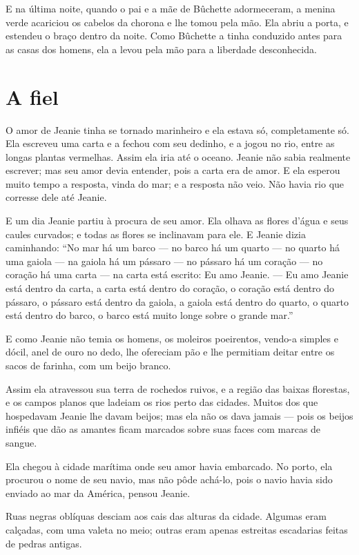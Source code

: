 E na última noite, quando o pai e a mãe de Bûchette adormeceram, a
menina verde acariciou os cabelos da chorona e lhe tomou pela mão. Ela
abriu a porta, e estendeu o braço dentro da noite. Como Bûchette a tinha
conduzido antes para as casas dos homens, ela a levou pela mão para a
liberdade desconhecida.

\section{A fiel}

O amor de Jeanie tinha se tornado marinheiro e ela estava só,
completamente só. Ela escreveu uma carta e a fechou com seu dedinho, e a
jogou no rio, entre as longas plantas vermelhas. Assim ela iria até o
oceano. Jeanie não sabia realmente escrever; mas seu amor devia entender,
pois a carta era de amor. E ela esperou muito tempo a resposta, vinda do
mar; e a resposta não veio. Não havia rio que corresse dele até Jeanie.

E um dia Jeanie partiu à procura de seu amor. Ela olhava as flores
d’água e seus caules curvados; e todas as flores se inclinavam para ele. E
Jeanie dizia caminhando: “No mar há um barco --- no barco há um quarto --- no
quarto há uma gaiola --- na gaiola há um pássaro --- no pássaro há um coração
--- no coração há uma carta --- na carta está escrito: Eu amo Jeanie. --- Eu amo
Jeanie está dentro da carta, a carta está dentro do coração, o coração
está dentro do pássaro, o pássaro está dentro da gaiola, a gaiola está
dentro do quarto, o quarto está dentro do barco, o barco está muito longe
sobre o grande mar.”

E como Jeanie não temia os homens, os moleiros poeirentos, vendo-a
simples e dócil, anel de ouro no dedo, lhe ofereciam pão e lhe permitiam
deitar entre os sacos de farinha, com um beijo branco.

Assim ela atravessou sua terra de rochedos ruivos, e a região das
baixas florestas, e os campos planos que ladeiam os rios perto das
cidades. Muitos dos que hospedavam Jeanie lhe davam beijos; mas ela não os
dava jamais --- pois os beijos infiéis que dão as amantes ficam marcados
sobre suas faces com marcas de sangue.

Ela chegou à cidade marítima onde seu amor havia embarcado. No porto,
ela procurou o nome de seu navio, mas não pôde achá-lo, pois o navio havia
sido enviado ao mar da América, pensou Jeanie.

Ruas negras oblíquas desciam aos cais das alturas da cidade. Algumas
eram calçadas, com uma valeta no meio; outras eram apenas estreitas
escadarias feitas de pedras antigas.

